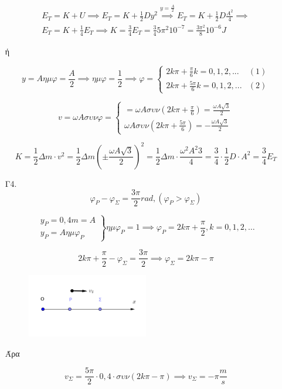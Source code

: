\documentclass[12pt]{article}
\begin{document}
\begin{enumerate}
      \begin{gather*}
        E_T=K+U\implies E_T=K+\frac{1}{2}Dy^2 \overset{y=\frac{A}{2}}{\implies} E_T=K+\frac{1}{2}D\frac{A^2}{4}\implies \\ E_T=K+\frac{1}{4}E_T\implies K=\frac{3}{4}E_T=\frac{3}{4}5\pi^2 10^{-7}=\frac{3\pi^2}{8}10^{-6} J
      \end{gather*}

      ή

      $$y=Aημφ=\frac{A}{2}\implies ημφ=\frac{1}{2}\implies φ=\begin{cases}2k\pi+\frac{\pi}{6} k=0,1,2,... & (1) \\ 2k\pi + \frac{5\pi}{6} k = 0,1,2,...  & (2)\end{cases}$$

      $$v=ωAσυνφ=\begin{cases}=ωAσυν\left(2k\pi+\frac{\pi}{6}\right)=\frac{ωA\sqrt{3}}{2} \\ ωAσυν\left(2k\pi+\frac{5\pi}{6}\right)=-\frac{ωA\sqrt{3}}{2}\end{cases}$$

      $$K=\frac{1}{2}Δm\cdot v^2=\frac{1}{2}Δm\left(\pm \frac{ωA\sqrt{3}}{2} \right)^2=\frac{1}{2}Δm\cdot \frac{ω^2A^2 3}{4}=\frac{3}{4}\cdot\frac{1}{2}D\cdot A^2=\frac{3}{4}E_T$$

      \item [Γ4.]
      $$φ_Ρ-φ_Σ=\frac{3\pi}{2}rad,(φ_Ρ>φ_Σ)$$

      $$\left. \begin{matrix}y_Ρ=0,4m=A \\ y_Ρ=Aημφ_Ρ\end{matrix} \right\} ημφ_Ρ=1\implies φ_Ρ=2k\pi+\frac{\pi}{2},k=0,1,2,\ldots$$

      $$2k\pi+\frac{\pi}{2}-φ_Σ=\frac{3\pi}{2}\implies φ_Σ=2k\pi-\pi$$

      \begin{figure}[h]
        \includegraphics[width=0.5\textwidth]{ΦυσικήΓ4.png}
        \centering
      \end{figure}
      Άρα

      $$v_Σ=\frac{5\pi}{2}\cdot 0,4\cdot συν\left(2k\pi-\pi\right)\implies v_Σ=-\pi \frac{m}{s}$$


\end{enumerate}
\end{document}
